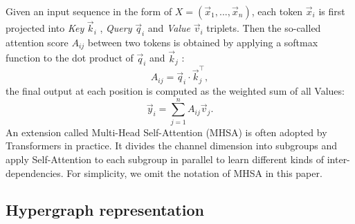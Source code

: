 \documentclass[10pt,twocolumn,letterpaper]{article}
\begin{document}


Given an input sequence in the form of $X=(\vec{x}_1,...,\vec{x}_n)$, each token $\vec{x}_i$ is first projected into \textit{Key} $\vec{k}_i$ , \textit{Query} $\vec{q}_i$  and \textit{Value} $\vec{v}_i$  triplets.
Then the so-called attention score $A_{ij}$ between two tokens is obtained by applying a softmax function to the dot product of $\vec{q}_i$ and $\vec{k}_j$ \cite{vaswani2017attention}:
\begin{equation}\label{eq:1} 
 A_{ij} = \vec{q}_i \cdot \vec{k}_j^\top,
\end{equation}
the final output at each position is computed as the weighted sum of all Values:
\begin{equation}
\label{eq:2}
\vec{y}_i = \sum_{j=1}^n A_{ij}\vec{v}_j
.
\end{equation}
An extension called Multi-Head Self-Attention (MHSA) is often adopted by Transformers in practice. It
divides the channel dimension into subgroups and apply Self-Attention to each subgroup in parallel to learn different kinds of inter-dependencies. For simplicity, we omit the notation of MHSA in this paper.
\subsection{Hypergraph representation}
\end{document}
